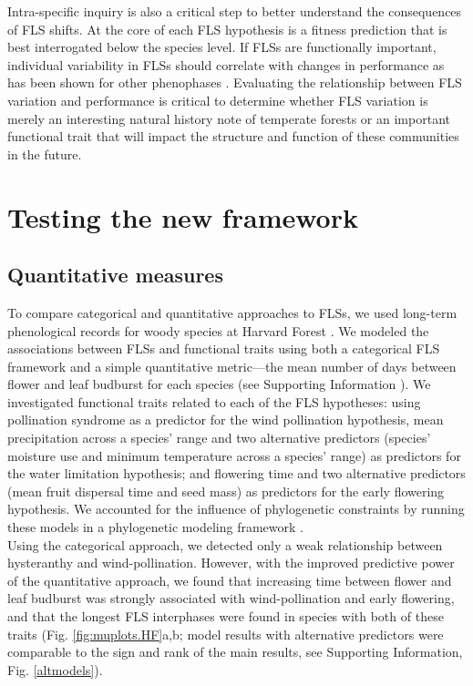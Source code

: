 \documentclass[11pt]{article}
\begin{document}
\noindent Intra-specific inquiry is also a critical step to better understand the consequences of FLS shifts. At the core of each FLS hypothesis is a fitness prediction that is best interrogated below the species level. If FLSs are functionally important, individual variability in FLSs should correlate with changes in performance as has been shown for other phenophases \citep[e.g.][]{Schermer2020}. Evaluating the relationship between FLS variation and performance is critical to determine whether FLS variation is merely an interesting natural history note of temperate forests or an important functional trait that will impact the structure and function of these communities in the future.\\ 

\section*{Testing the new framework}
\subsection*{Quantitative measures}
\noindent To compare categorical and quantitative approaches to FLSs, we used long-term phenological records for woody species at Harvard Forest \citep{OKeefe2015}. We modeled the associations between FLSs and functional traits using both a categorical FLS framework and a simple quantitative metric---the mean number of days between flower and leaf budburst for each species (see Supporting Information ). We investigated functional traits related to each of the FLS hypotheses: using pollination syndrome as a predictor for the wind pollination hypothesis, mean precipitation across a species' range and two alternative predictors (species' moisture use and minimum temperature across a species' range) as predictors for the water limitation hypothesis; and flowering time and two alternative predictors (mean fruit dispersal time and seed mass) as predictors for the early flowering hypothesis. We accounted for the influence of phylogenetic constraints by running these models in a phylogenetic modeling framework \citep{Ives2010}.\\ %

\noindent Using the categorical approach, we detected only a weak relationship between hysteranthy and wind-pollination. However, with the improved predictive power of the quantitative approach, we found that increasing time between flower and leaf budburst was strongly associated with wind-pollination and early flowering, and that the longest FLS interphases were found in species with both of these traits (Fig. \ref{fig:muplots.HF}a,b; model results with alternative predictors were comparable to the sign and rank of the main results, see Supporting Information, Fig. \ref{altmodels}).\\  %
\end{document}
